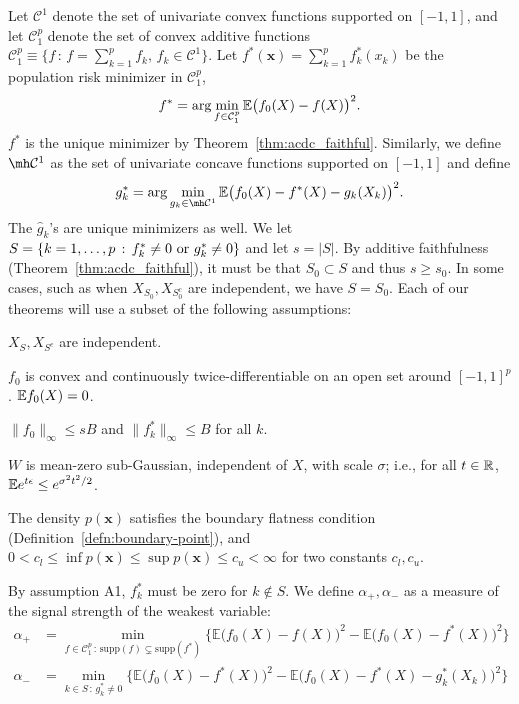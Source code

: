 Let $\mathcal{C}^1$ denote the set of univariate convex functions
supported on $[-1,1]$, 
and let  $\mathcal{C}_1^{p}$ denote the set of convex additive functions
$\mathcal{C}_1^p \equiv \{ f \,:\, f = \sum_{k=1}^p f_k, \,
   f_k \in \mathcal{C}^1 \} $.  
Let $f^*(\mathbf{x}) = \sum_{k=1}^p f^*_k(x_k)$ be the population risk
minimizer in $\mathcal{C}_1^p$, 
\begin{equation}
f^* = \arg\min_{f \in \mathcal{C}_1^p} {\mathbb E}\big(f_0(X) - f(X)
\big)^2.
\end{equation}
$f^*$ is the unique minimizer by Theorem~\ref{thm:acdc_faithful}. Similarly, we define $\mh \mathcal{C}^1$ as the set of univariate concave functions supported on $[-1, 1]$ and define
\begin{equation}
g^*_k = \arg\min_{g_k \in \mh \mathcal{C}^1} \E \big( f_0(X) - f^*(X)
- g_k(X_k) \big)^2.
\end{equation}
The $\hat{g}_k$'s are unique minimizers as well. We let $S = \{ k = 1,\ldots,p \,:\, f^*_k \neq 0 \textrm{ or } g^*_k \neq 0\}$ and let $s = |S|$. By additive faithfulness (Theorem~\ref{thm:acdc_faithful}), it must be that $S_0 \subset S$ and thus $s \geq s_0$. In some cases, such as when $X_{S_0}, X_{S^c_0}$ are independent, we have $S = S_0$.
Each of our theorems will use a subset of the following assumptions:
\begin{packed_enum}
\item[A1:] $X_S, X_{S^c}$ are independent. 
\item[A2:] $f_0$ is convex and continuously twice-differentiable on an open set around $[-1,1]^p$. ${\mathbb E} f_0(X) = 0$.
\item[A3:] $\|f_0\|_\infty \leq sB$ and $\| f^*_k \|_\infty \leq B$ for all $k$.
\item[A4:] $W$ is mean-zero sub-Gaussian, independent of $X$, with scale $\sigma$; i.e., for all $t \in {\mathbb R}$, ${\mathbb E} e^{t \epsilon} \leq e^{\sigma^2 t^2 / 2}$.
\item[A5:] The density $p(\mathbf{x})$ satisfies the boundary flatness condition (Definition~\ref{defn:boundary-point}), and $0 < c_l \leq \inf p(\mathbf{x}) \leq \sup p(\mathbf{x}) \leq c_u < \infty$ for two constants $c_l, c_u$. 
\end{packed_enum}
By assumption A1, $f^*_k$ must be zero for $k\notin S$.
We define $\alpha_{+}, \alpha_{-}$ as a measure of the signal strength of the weakest variable:
\begin{align}
\alpha_{+} &= \min_{f \in \mathcal{C}_1^p \,:\, \textrm{supp}(f) \subsetneq \textrm{supp}(f^*)} 
       \Big\{ \mathbb{E} \big( f_0(X) - f(X) \big)^2 - 
        \mathbb{E} \big( f_0(X) - f^*(X) \big)^2  \Big\} \label{eqn:signal_level_defn} \\
\alpha_{-} &=   \min_{k \in S \,:\, g^*_k \neq 0}
      \Big\{ \mathbb{E} \big( f_0(X) - f^*(X) \big)^2 - 
    \mathbb{E} \big( f_0(X) - f^*(X) - g^*_k(X_k) \big)^2 \Big\} \nonumber
\end{align}
